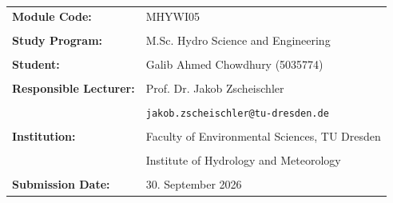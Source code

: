 \begin{titlepage}
    \raggedright
    \begin{tabular}{@{}p{4.5cm} p{9.5cm}@{}}
        \textbf{Module Code:} & MHYWI05 \\
        \vspace{0.7cm} \\
        \textbf{Study Program:} & M.Sc. Hydro Science and Engineering \\
        \vspace{0.7cm} \\
        \textbf{Student:} & Galib Ahmed Chowdhury (5035774) \\
        \vspace{0.7cm} \\
        \textbf{Responsible Lecturer:} & Prof. Dr. Jakob Zscheischler \\
        \vspace{0.3cm} \\
         & \texttt{jakob.zscheischler@tu-dresden.de} \\
        \vspace{0.7cm} \\
        \textbf{Institution:} & Faculty of Environmental Sciences, TU Dresden \\
        \vspace{0.3cm} \\
         & Institute of Hydrology and Meteorology \\
        \vspace{0.7cm} \\
        \textbf{Submission Date:} & 30. September 2026 \\
    \end{tabular}
    
    \vfill
\end{titlepage}